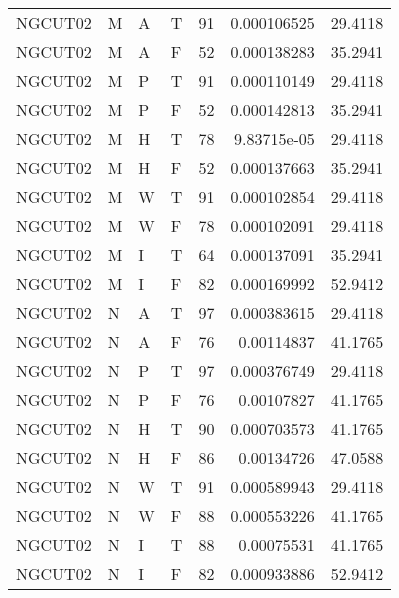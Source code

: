 \begin{tabular}{llllrrr}
    NGCUT02  & M     & A     & T          & 91         & 0.000106525 & 29.4118  \\
    NGCUT02  & M     & A     & F          & 52         & 0.000138283 & 35.2941  \\
    NGCUT02  & M     & P     & T          & 91         & 0.000110149 & 29.4118  \\
    NGCUT02  & M     & P     & F          & 52         & 0.000142813 & 35.2941  \\
    NGCUT02  & M     & H     & T          & 78         & 9.83715e-05 & 29.4118  \\
    NGCUT02  & M     & H     & F          & 52         & 0.000137663 & 35.2941  \\
    NGCUT02  & M     & W     & T          & 91         & 0.000102854 & 29.4118  \\
    NGCUT02  & M     & W     & F          & 78         & 0.000102091 & 29.4118  \\
    NGCUT02  & M     & I     & T          & 64         & 0.000137091 & 35.2941  \\
    NGCUT02  & M     & I     & F          & 82         & 0.000169992 & 52.9412  \\
    NGCUT02  & N     & A     & T          & 97         & 0.000383615 & 29.4118  \\
    NGCUT02  & N     & A     & F          & 76         & 0.00114837  & 41.1765  \\
    NGCUT02  & N     & P     & T          & 97         & 0.000376749 & 29.4118  \\
    NGCUT02  & N     & P     & F          & 76         & 0.00107827  & 41.1765  \\
    NGCUT02  & N     & H     & T          & 90         & 0.000703573 & 41.1765  \\
    NGCUT02  & N     & H     & F          & 86         & 0.00134726  & 47.0588  \\
    NGCUT02  & N     & W     & T          & 91         & 0.000589943 & 29.4118  \\
    NGCUT02  & N     & W     & F          & 88         & 0.000553226 & 41.1765  \\
    NGCUT02  & N     & I     & T          & 88         & 0.00075531  & 41.1765  \\
    NGCUT02  & N     & I     & F          & 82         & 0.000933886 & 52.9412  \\
    \hline
\end{tabular}
